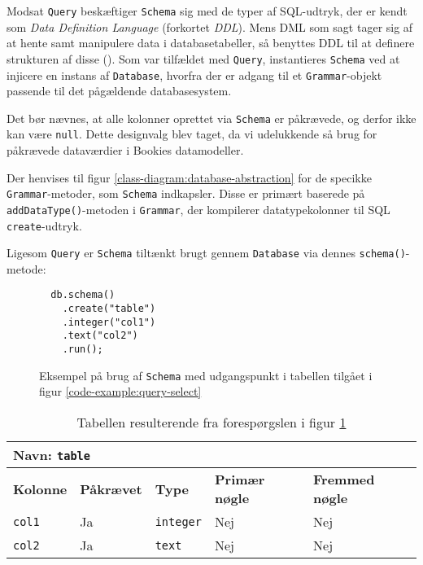 Modsat \texttt{Query} beskæftiger \texttt{Schema} sig med de typer af SQL-udtryk, der er kendt som \textit{Data Definition Language} (forkortet \textit{DDL}). Mens DML som sagt tager sig af at hente samt manipulere data i databasetabeller, så benyttes DDL til at definere strukturen af disse (\cite{wiki:ddl}). Som var tilfældet med \texttt{Query}, instantieres \texttt{Schema} ved at injicere en instans af \texttt{Database}, hvorfra der er adgang til et \texttt{Grammar}-objekt passende til det pågældende databasesystem.

Det bør nævnes, at alle kolonner oprettet via \texttt{Schema} er påkrævede, og derfor ikke kan være \texttt{null}. Dette designvalg blev taget, da vi udelukkende så brug for påkrævede dataværdier i Bookies datamodeller.

Der henvises til figur \ref{class-diagram:database-abstraction} for de specikke \texttt{Grammar}-metoder, som \texttt{Schema} indkapsler. Disse er primært baserede på \texttt{addDataType()}-metoden i \texttt{Grammar}, der kompilerer datatypekolonner til SQL \texttt{create}-udtryk.

Ligesom \texttt{Query} er \texttt{Schema} tiltænkt brugt gennem \texttt{Database} via dennes \texttt{schema()}-metode:

\begin{figure}[h]
  \begin{verbatim}
  db.schema()
    .create("table")
    .integer("col1")
    .text("col2")
    .run();
  \end{verbatim}
  \caption{Eksempel på brug af \texttt{Schema} med udgangspunkt i tabellen tilgået i figur \ref{code-example:query-select}}
  \label{code-example:schema-create}
\end{figure}

\begin{table}[h]
  \centering
  \begin{tabular}{l | l | l | l | l}

    \multicolumn{3}{l}{\textbf{Navn}: \texttt{table}} \\

    \hline

    \textbf{Kolonne} & \textbf{Påkrævet} & \textbf{Type} & \textbf{Primær nøgle} & \textbf{Fremmed nøgle} \\

    \hline

    \texttt{col1} & Ja & \texttt{integer} & Nej & Nej \\
    \texttt{col2} & Ja & \texttt{text} & Nej & Nej \\

    \hline

  \end{tabular}
  \caption{Tabellen resulterende fra forespørgslen i figur \ref{code-example:schema-create}}
\end{table}

